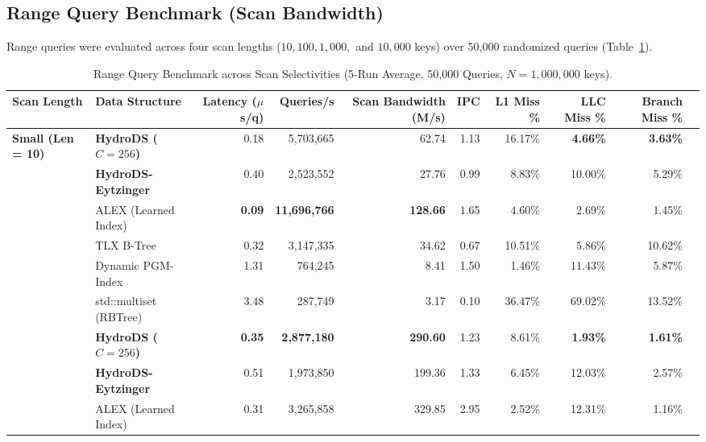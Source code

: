 \documentclass[10pt,twocolumn,letterpaper]{article}
\theoremstyle{definition}
\begin{document}
\subsection{Range Query Benchmark (Scan Bandwidth)}

Range queries were evaluated across four scan lengths ($10, 100, 1{,}000,$ and $10{,}000$ keys) over 50,000 randomized queries (Table~\ref{tab:range_results}).

\begin{table}[t]
\centering
\caption{Range Query Benchmark across Scan Selectivities (5-Run Average, 50,000 Queries, $N{=}1{,}000{,}000$ keys).}
\label{tab:range_results}
\scriptsize\setlength{\tabcolsep}{4.2pt}
\renewcommand{\arraystretch}{1.08}
\begin{tabular}{@{}llrrrrrrrr@{}}
\toprule
\textbf{Scan Length} & \textbf{Data Structure} & \textbf{Latency ($\mu$s/q)} & \textbf{Queries/s} & \textbf{Scan Bandwidth (M/s)} & \textbf{IPC} & \textbf{L1 Miss \%} & \textbf{LLC Miss \%} & \textbf{Branch Miss \%}\\
\midrule
\multirow{6}{*}{\textbf{Small (Len = 10)}}
  & \textbf{HydroDS ($C{=}256$)}   & 0.18 & 5,703,665 & 62.74 & 1.13 & 16.17\% & \textbf{4.66\%} & \textbf{3.63\%}\\
  & \textbf{HydroDS-Eytzinger}     & 0.40 & 2,523,552 & 27.76 & 0.99 & 8.83\% & 10.00\% & 5.29\%\\
  & ALEX (Learned Index)          & \textbf{0.09} & \textbf{11,696,766} & \textbf{128.66} & 1.65 & 4.60\% & 2.69\% & 1.45\%\\
  & TLX B-Tree                    & 0.32 & 3,147,335 & 34.62 & 0.67 & 10.51\% & 5.86\% & 10.62\%\\
  & Dynamic PGM-Index             & 1.31 & 764,245 & 8.41 & 1.50 & 1.46\% & 11.43\% & 5.87\%\\
  & std::multiset (RBTree)        & 3.48 & 287,749 & 3.17 & 0.10 & 36.47\% & 69.02\% & 13.52\%\\
\midrule
\rowcolor{rowgray}
\multirow{6}{*}{\textbf{Medium (Len = 100)}}
  & \textbf{HydroDS ($C{=}256$)}   & \textbf{0.35} & \textbf{2,877,180} & \textbf{290.60} & 1.23 & 8.61\% & \textbf{1.93\%} & \textbf{1.61\%}\\
\rowcolor{rowgray}
  & \textbf{HydroDS-Eytzinger}     & 0.51 & 1,973,850 & 199.36 & 1.33 & 6.45\% & 12.03\% & 2.57\%\\
\rowcolor{rowgray}
  & ALEX (Learned Index)          & 0.31 & 3,265,858 & 329.85 & 2.95 & 2.52\% & 12.31\% & 1.16\%\\

\end{tabular}
\end{table}
\end{document}
